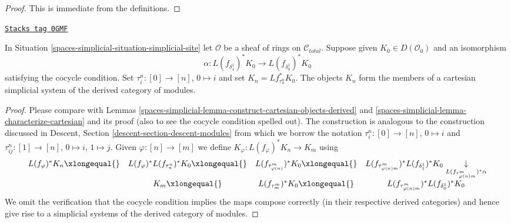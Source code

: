 \begin{proof}
This is immediate from the definitions.
\end{proof}

\begin{lemma}
\label{spaces-simplicial-lemma-construct-cartesian-objects-derived-modules}
\href{https://stacks.math.columbia.edu/tag/0GMF}{\texttt{Stacks tag 0GMF}}

In Situation \ref{spaces-simplicial-situation-simplicial-site} let $\mathcal{O}$ be a
sheaf of rings on $\mathcal{C}_{total}$.
Suppose given $K_0 \in D(\mathcal{O}_0)$ and an isomorphism
$$
\alpha :
L(f_{\delta_1^1})^*K_0
\longrightarrow
L(f_{\delta_0^1})^*K_0
$$
satisfying the cocycle condition. Set $\tau^n_i : [0] \to [n]$, $0 \mapsto i$
and set $K_n = Lf_{\tau^n_n}^*K_0$. The objects $K_n$ form the members of a
cartesian simplicial system of the derived category of modules.
\end{lemma}

\begin{proof}
Please compare with Lemmas \ref{spaces-simplicial-lemma-construct-cartesian-objects-derived}
and \ref{spaces-simplicial-lemma-characterize-cartesian} and its proof
(also to see the cocycle condition spelled out).
The construction is analogous to the construction discussed in
Descent, Section \ref{descent-section-descent-modules} from which we borrow
the notation $\tau^n_i : [0] \to [n]$, $0 \mapsto i$ and
$\tau^n_{ij} : [1] \to [n]$, $0 \mapsto i$, $1 \mapsto j$.
Given $\varphi : [n] \to [m]$ we define
$K_\varphi : L(f_\varphi)^*K_n \to K_m$
using
$$
\begin{array}{cccc}L(f_\varphi)^*K_n \xlongequal{} & L(f_\varphi)^* L(f_{\tau^n_n})^*K_0 \xlongequal{} & L(f_{\tau^m_{\varphi(n)}})^*K_0 \xlongequal{} & L(f_{\tau^m_{\varphi(n)m}})^* L(f_{\delta^1_1})^*K_0
\underset{L(f_{\tau^m_{\varphi(n)m}})^*\alpha}{\downarrow} \\  & K_m \xlongequal{} & L(f_{\tau^m_m})^*K_0 \xlongequal{} & L(f_{\tau^m_{\varphi(n)m}})^* L(f_{\delta^1_0})^*K_0\end{array}
$$
We omit the verification that the cocycle condition
implies the maps compose correctly (in their respective
derived categories) and hence give rise to a
simplicial systems of the derived category of modules.
\end{proof}

